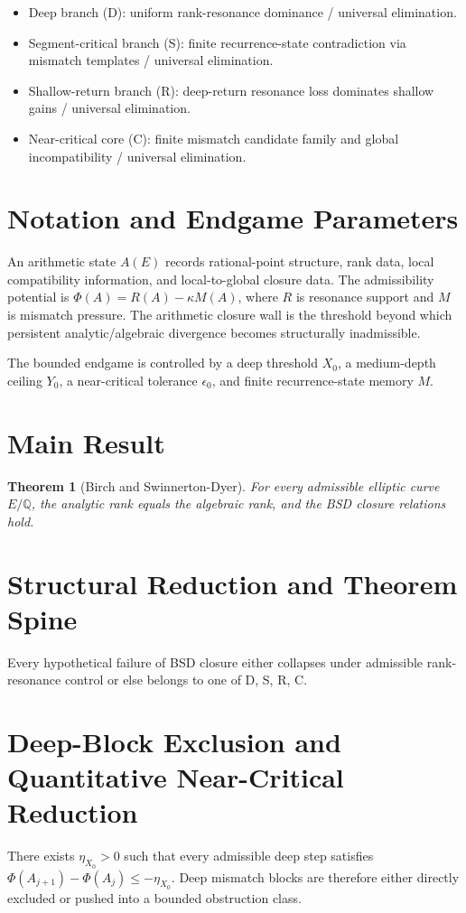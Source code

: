 \documentclass[11pt,a4paper]{article}
\newtheorem{theorem}{Theorem}
\begin{document}
\begin{itemize}
    \item Deep branch (D): uniform rank-resonance dominance / universal elimination.
    \item Segment-critical branch (S): finite recurrence-state contradiction via mismatch templates / universal elimination.
    \item Shallow-return branch (R): deep-return resonance loss dominates shallow gains / universal elimination.
    \item Near-critical core (C): finite mismatch candidate family and global incompatibility / universal elimination.
\end{itemize}

\section{Notation and Endgame Parameters}
An arithmetic state \(A(E)\) records rational-point structure, rank data, local compatibility information, and local-to-global closure data. The admissibility potential is \(\Phi(A) = R(A) - \kappa M(A)\), where \(R\) is resonance support and \(M\) is mismatch pressure. The arithmetic closure wall is the threshold beyond which persistent analytic/algebraic divergence becomes structurally inadmissible.

The bounded endgame is controlled by a deep threshold \(X_0\), a medium-depth ceiling \(Y_0\), a near-critical tolerance \(\epsilon_0\), and finite recurrence-state memory \(M\).

\section{Main Result}
\begin{theorem}[Birch and Swinnerton-Dyer]
For every admissible elliptic curve \(E/\mathbb{Q}\), the analytic rank equals the algebraic rank, and the BSD closure relations hold.
\end{theorem}

\section{Structural Reduction and Theorem Spine}
Every hypothetical failure of BSD closure either collapses under admissible rank-resonance control or else belongs to one of D, S, R, C.

\section{Deep-Block Exclusion and Quantitative Near-Critical Reduction}
There exists \(\eta_{X_0} > 0\) such that every admissible deep step satisfies \(\Phi(A_{j+1}) - \Phi(A_j) \le -\eta_{X_0}\). Deep mismatch blocks are therefore either directly excluded or pushed into a bounded obstruction class.
\end{document}
